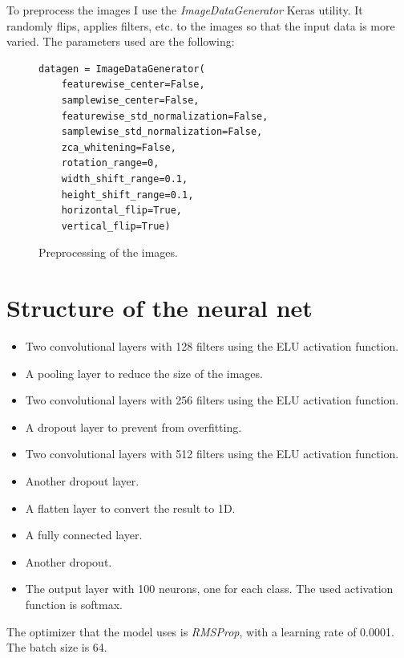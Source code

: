 \documentclass[12pt,english]{article}
\begin{document}
To preprocess the images I use the \emph{ImageDataGenerator} Keras utility. It randomly flips, applies filters, etc. to the images so that the input data is more varied. The parameters used are the following:

\begin{figure}[H]
\centering
\begin{verbatim}
datagen = ImageDataGenerator(
    featurewise_center=False,
    samplewise_center=False,
    featurewise_std_normalization=False,
    samplewise_std_normalization=False,
    zca_whitening=False,
    rotation_range=0,
    width_shift_range=0.1,
    height_shift_range=0.1,
    horizontal_flip=True,
    vertical_flip=True)
\end{verbatim}
\caption{Preprocessing of the images.}
\end{figure}

\section{Structure of the neural net}

\begin{itemize}
	\item Two convolutional layers with 128 filters using the ELU activation function.
	\item A pooling layer to reduce the size of the images.
	\item Two convolutional layers with 256 filters using the ELU activation function.
	\item A dropout layer to prevent from overfitting.
	\item Two convolutional layers with 512 filters using the ELU activation function.
	\item Another dropout layer.
	\item A flatten layer to convert the result to 1D.
	\item A fully connected layer.
	\item Another dropout.
	\item The output layer with 100 neurons, one for each class. The used activation function is softmax.
\end{itemize}

The optimizer that the model uses is \emph{RMSProp}, with a learning rate of 0.0001. The batch size is 64.
\end{document}
